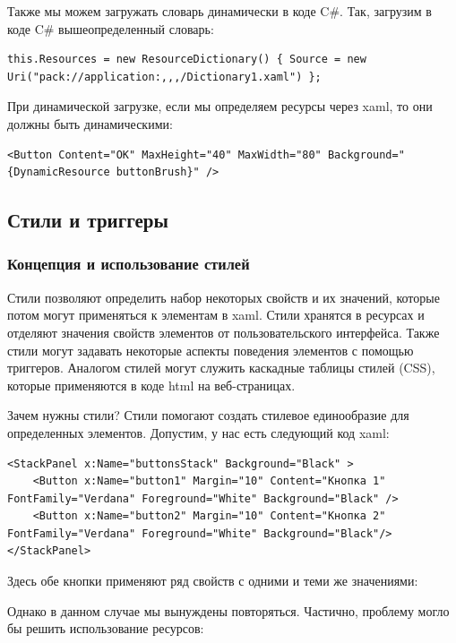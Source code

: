Также мы можем загружать словарь динамически в коде C\#. Так, загрузим в коде C\# вышеопределенный словарь:

\begin{verbatim}
this.Resources = new ResourceDictionary() { Source = new Uri("pack://application:,,,/Dictionary1.xaml") };
\end{verbatim}

При динамической загрузке, если мы определяем ресурсы через xaml, то они должны быть динамическими:

\begin{verbatim}
<Button Content="OK" MaxHeight="40" MaxWidth="80" Background="{DynamicResource buttonBrush}" />
\end{verbatim}

\subsection{Стили и триггеры}

\subsubsection{Концепция и использование стилей}
    
Стили позволяют определить набор некоторых свойств и их значений, которые потом могут применяться к элементам в xaml. Стили хранятся в ресурсах и отделяют значения свойств элементов от пользовательского интерфейса. Также стили могут задавать некоторые аспекты поведения элементов с помощью триггеров. Аналогом стилей могут служить каскадные таблицы стилей (CSS), которые применяются в коде html на веб-страницах.

Зачем нужны стили? Стили помогают создать стилевое единообразие для определенных элементов. Допустим, у нас есть следующий код xaml:

\begin{verbatim}
<StackPanel x:Name="buttonsStack" Background="Black" >
    <Button x:Name="button1" Margin="10" Content="Кнопка 1" FontFamily="Verdana" Foreground="White" Background="Black" />
    <Button x:Name="button2" Margin="10" Content="Кнопка 2" FontFamily="Verdana" Foreground="White" Background="Black"/>
</StackPanel>
\end{verbatim}

Здесь обе кнопки применяют ряд свойств с одними и теми же значениями:

Однако в данном случае мы вынуждены повторяться. Частично, проблему могло бы решить использование ресурсов:

